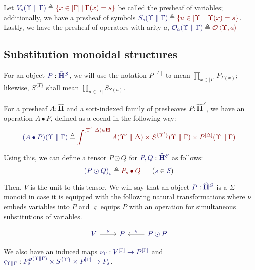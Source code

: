 \documentclass[11pt]{article}
\theoremstyle{definition}
\theoremstyle{remark}
\numberwithin{equation}{section}
\def\IModeColorName{MidnightBlue}
\def\OModeColorName{Maroon}
\newcommand\IMode[1]{{\color{\IModeColorName}{#1}}}
\newcommand\OMode[1]{{\color{\OModeColorName}{#1}}}
\newcommand\HypJ[2]{#1\ \ (#2)}
\newcommand\MkSet[1]{\left\{#1\right\}}
\newcommand\Member[2]{\IMode{#1}\in\IMode{#2}}
\newcommand\Of[2]{\IMode{#1}: \IMode{#2}}
\newcommand\Sorts{\mathcal{S}}
\newcommand\Operators{\mathcal{O}}
\newcommand\HypCat{\mathbf{H}}
\newcommand\Pair[2]{\left\langle#1, #2 \right\rangle}
\newcommand\Dom[1]{\left\vert#1\right\vert}
\newcommand\Define[2]{\IMode{#1}\triangleq\OMode{#2}}
\newcommand\Yoneda[1]{\boldsymbol{y} (#1)}
\begin{document}
Let $\Define{V_s(\Upsilon\parallel\Gamma)}{\MkSet{x\in\Dom\Gamma\mid
\Gamma(x)=s}}$ be called the presheaf of variables; additionally, we have a
presheaf of symbols
$\Define{S_s(\Upsilon\parallel\Gamma)}{\MkSet{u\in\Dom\Upsilon\mid
\Upsilon(x)=s}}$. Lastly, we have the presheaf of operators with arity $a$,
$\Define{\Operators_a(\Upsilon\parallel\Gamma)}{\Operators\Pair{\Upsilon}{a}}$

\subsection{Substitution monoidal structures}

For an object $\Of{P}{\widehat{\HypCat}^\Sorts}$, we will use the notation
$P^{[\Gamma]}$ to mean $\prod_{x\in\Dom\Gamma}P_{\Gamma(x)}$; likewise,
$S^{\{\Upsilon\}}$ shall mean $\prod_{u\in\Dom\Upsilon}S_{\Upsilon(u)}$.

For a presheaf $A:\widehat{\HypCat}$ and a sort-indexed family of presheaves
$P:\widehat{\HypCat}^\Sorts$, we have an operation $A\bullet P$,
defined as a coend in the following way:
\[
  \Define{(A\bullet P)(\Upsilon\parallel\Gamma)}{
    \int^{(\Upsilon'\parallel\Delta)\in\HypCat}
      A(\Upsilon'\parallel\Delta)
      \times S^{\{\Upsilon'\}}(\Upsilon\parallel\Gamma)
      \times P^{[\Delta]}(\Upsilon\parallel\Gamma)
  }
\]

Using this, we can define a tensor $P\odot Q$ for
$\Of{P,Q}{\widehat{\HypCat}^\Sorts}$ as follows:
\[
  \HypJ{
    \Define{{(P\odot Q)}_{s}}{
      P_s\bullet Q
    }
    \quad
  }{
    \Member{s}{\Sorts}
  }
\]

Then, $V$ is the unit to this tensor. We will say that an object
$\Of{P}{\widehat{\HypCat}^\Sorts}$ is a $\Sigma$-monoid in case it is equipped
with the following natural transformations where $\nu$ embeds variables into
$P$ and $\varsigma$ equips $P$ with an operation for simultaneous substitutions
of variables.

\[
  \begin{tikzcd}[ampersand replacement = \&]
    {\IMode{V}} \arrow[r, "\IMode\nu"]
    \& {\IMode{P}}
    \& {\IMode{P\odot P}}
    \arrow[l, "\IMode\varsigma", swap]
  \end{tikzcd}
\]

We also have an induced maps $\Of{\nu_\Gamma}{V^{[\Gamma]}\to P^{[\Gamma]}}$
and
$\Of{\varsigma_{\Upsilon\parallel\Gamma}}{P_s^{\Yoneda{\Upsilon\parallel\Gamma}} \times
S^{\{\Upsilon\}}\times P^{[\Gamma]}\to P_s}$.
\end{document}
